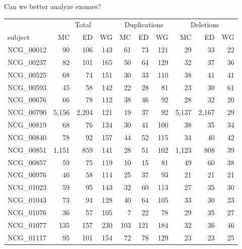 \documentclass[
  10pt,
  ignorenonframetext,
  m]{beamer}
\begin{document}
\begin{frame}{Can we better analyze exomes?}
\protect\hypertarget{can-we-better-analyze-exomes-5}{}

\scriptsize

\begin{table}[H]
\centering
\begin{tabular}{lrrrrrrrrr}
\toprule
\multicolumn{1}{c}{ } & \multicolumn{3}{c}{Total} & \multicolumn{3}{c}{Duplications} & \multicolumn{3}{c}{Deletions} \\
\cmidrule(l{3pt}r{3pt}){2-4} \cmidrule(l{3pt}r{3pt}){5-7} \cmidrule(l{3pt}r{3pt}){8-10}
subject & MC & ED & WG & MC & ED & WG & MC & ED & WG\\
\midrule
NCG\_00012 & 90 & 106 & 143 & 61 & 73 & 121 & 29 & 33 & 22\\
NCG\_00237 & 82 & 101 & 165 & 50 & 64 & 129 & 32 & 37 & 36\\
NCG\_00525 & 68 & 74 & 151 & 30 & 33 & 110 & 38 & 41 & 41\\
NCG\_00593 & 45 & 58 & 142 & 22 & 28 & 81 & 23 & 30 & 61\\
NCG\_00676 & 66 & 78 & 112 & 38 & 46 & 92 & 28 & 32 & 20\\
NCG\_00790 & 5,156 & 2,204 & 121 & 19 & 37 & 92 & 5,137 & 2,167 & 29\\
NCG\_00819 & 68 & 76 & 134 & 30 & 41 & 100 & 38 & 35 & 34\\
NCG\_00840 & 78 & 92 & 157 & 44 & 52 & 115 & 34 & 40 & 42\\
NCG\_00851 & 1,151 & 859 & 141 & 28 & 51 & 102 & 1,123 & 808 & 39\\
NCG\_00857 & 59 & 75 & 119 & 10 & 15 & 81 & 49 & 60 & 38\\
NCG\_00976 & 46 & 58 & 114 & 25 & 37 & 93 & 21 & 21 & 21\\
NCG\_01023 & 59 & 95 & 143 & 32 & 60 & 113 & 27 & 35 & 30\\
NCG\_01043 & 73 & 94 & 128 & 40 & 64 & 105 & 33 & 30 & 23\\
NCG\_01076 & 36 & 57 & 105 & 7 & 22 & 78 & 29 & 35 & 27\\
NCG\_01077 & 135 & 157 & 230 & 103 & 121 & 184 & 32 & 36 & 46\\
NCG\_01117 & 95 & 101 & 154 & 72 & 78 & 129 & 23 & 23 & 25\\
\bottomrule
\end{tabular}
\end{table}

\end{frame}
\end{document}
